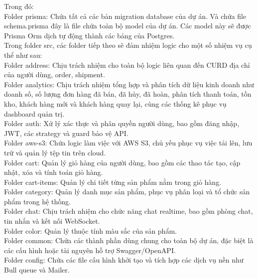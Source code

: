 Trong đó: \\

Folder prisma: Chứa tất cả các bản migration database của dự án. Và chứa file schema.prisma đây là file chứa toàn bộ model của dự án. Các model này sẽ được Prisma Orm dịch tự động thành các bảng của Postgres. \\

Trong folder src, các folder tiếp theo sẽ đảm nhiệm logic cho một số nhiệm vụ cụ thể như sau: \\

Folder address: Chịu trách nhiệm cho toàn bộ logic liên quan đến CURD địa chỉ của người dùng, order, shipment. \\

Folder analytics: Chịu trách nhiệm tổng hợp và phân tích dữ liệu kinh doanh như doanh số, số lượng đơn hàng đã bán, đã hủy, đã hoàn, phân tích thanh toán, tồn kho, khách hàng mới và khách hàng quay lại, cùng các thống kê phục vụ dashboard quản trị. \\

Folder auth: Xử lý xác thực và phân quyền người dùng, bao gồm đăng nhập, JWT, các strategy và guard bảo vệ API. \\

Folder aws-s3: Chứa logic làm việc với AWS S3, chủ yếu phục vụ việc tải lên, lưu trữ và quản lý tệp tin trên cloud. \\

Folder cart: Quản lý giỏ hàng của người dùng, bao gồm các thao tác tạo, cập nhật, xóa và tính toán giỏ hàng. \\

Folder cart-items: Quản lý chi tiết từng sản phẩm nằm trong giỏ hàng. \\

Folder category: Quản lý danh mục sản phẩm, phục vụ phân loại và tổ chức sản phẩm trong hệ thống. \\

Folder chat: Chịu trách nhiệm cho chức năng chat realtime, bao gồm phòng chat, tin nhắn và kết nối WebSocket. \\

Folder color: Quản lý thuộc tính màu sắc của sản phẩm. \\

Folder common: Chứa các thành phần dùng chung cho toàn bộ dự án, đặc biệt là các cấu hình hoặc tài nguyên hỗ trợ Swagger/OpenAPI. \\

Folder config: Chứa các file cấu hình khởi tạo và tích hợp các dịch vụ nền như Bull queue và Mailer. \\

